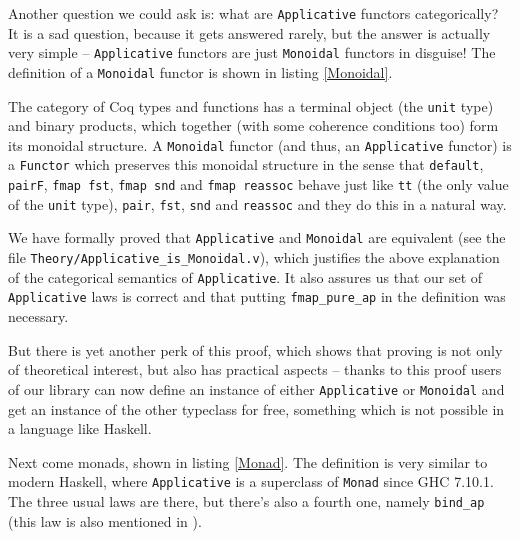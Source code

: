 \documentclass[declaration,inz,english,shortabstract]{iithesis}
\newcommand{\m}[1]{\texttt{#1}}
\begin{document}

Another question we could ask is: what are \m{Applicative} functors categorically? It is a sad question, because it gets answered rarely, but the answer is actually very simple -- \m{Applicative} functors are just \m{Monoidal} functors in disguise! The definition of a \m{Monoidal} functor is shown in listing \ref{Monoidal}. 

The category of Coq types and functions has a terminal object (the \m{unit} type) and binary products, which together (with some coherence conditions too) form its monoidal structure. A \m{Monoidal} functor (and thus, an \m{Applicative} functor) is a \m{Functor} which preserves this monoidal structure in the sense that \m{default}, \m{pairF}, \m{fmap fst}, \m{fmap snd} and \m{fmap reassoc} behave just like \m{tt} (the only value of the \m{unit} type), \m{pair}, \m{fst}, \m{snd} and \m{reassoc} and they do this in a natural way.

We have formally proved that \m{Applicative} and \m{Monoidal} are equivalent (see the file \m{Theory/Applicative\_is\_Monoidal.v}), which justifies the above explanation of the categorical semantics of \m{Applicative}. It also assures us that our set of \m{Applicative} laws is correct and that putting \m{fmap\_pure\_ap} in the definition was necessary.

But there is yet another perk of this proof, which shows that proving is not only of theoretical interest, but also has practical aspects -- thanks to this proof users of our library can now define an instance of either \m{Applicative} or \m{Monoidal} and get an instance of the other typeclass for free, something which is not possible in a language like Haskell.


Next come monads, shown in listing \ref{Monad}. The definition is very similar to modern Haskell, where \m{Applicative} is a superclass of \m{Monad} since GHC 7.10.1. The three usual laws are there, but there's also a fourth one, namely \m{bind\_ap} (this law is also mentioned in \cite{HackageMonad}).
\end{document}

